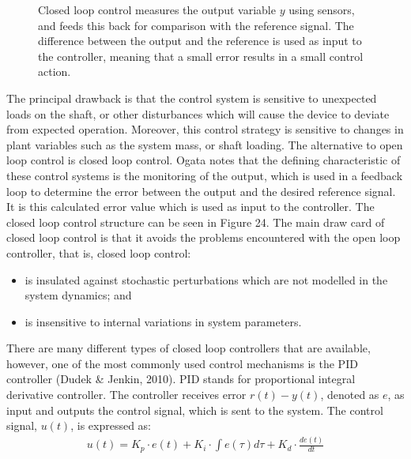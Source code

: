 \documentclass[a4paper]{article}
\begin{document}
\begin{figure}[h]
\begin{minipage}[t]{0.45\textwidth}
\caption{Closed loop control measures the output variable $y$ using sensors, and feeds this back for comparison with the reference signal. The difference between the output and the reference is used as input to the controller, meaning that a small error results in a small control action.}
\end{minipage}
\end{figure}

The principal drawback is that the control system is sensitive to unexpected loads on the shaft, or other disturbances which will cause the device to deviate from expected operation. Moreover, this control strategy is sensitive to changes in plant variables such as the system mass, or shaft loading. The alternative to open loop control is closed loop control. Ogata notes that the defining characteristic of these control systems is the monitoring of the output, which is used in a feedback loop to determine the error between the output and the desired reference signal. It is this calculated error value which is used as input to the controller. The closed loop control structure can be seen in Figure 24. The main draw card of closed loop control is that it avoids the problems encountered with the open loop controller, that is, closed loop control:
\begin{itemize}
\item is insulated against stochastic perturbations which are not modelled in the system dynamics; and
\item is insensitive to internal variations in system parameters.
\end{itemize}

There are many different types of closed loop controllers that are available, however, one of the most commonly used control mechanisms is the PID controller (Dudek \& Jenkin, 2010). PID stands for proportional integral derivative controller. The controller receives error $r(t) - y(t)$, denoted as $e$, as input and outputs the control signal, which is sent to the system. The control signal, $u(t)$, is expressed as:
\begin{align*}
u(t)  = K_p \cdot e(t) + K_i \cdot \int e(\tau) d\tau + K_d \cdot \frac{d e(t)}{dt}
\end{align*}
\end{document}
